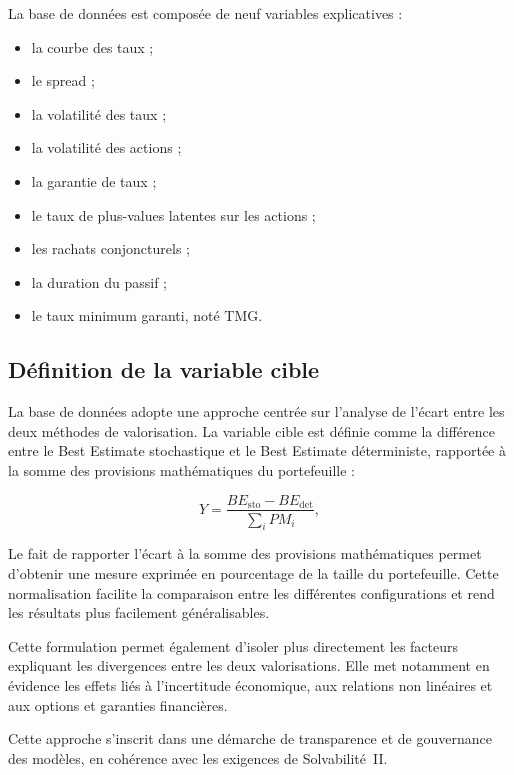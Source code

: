 La base de données est composée de neuf variables explicatives :

\begin{itemize}[label=\textemdash, nosep, leftmargin=2.5em]
    \item la courbe des taux ;
    \item le spread ;
    \item la volatilité des taux ;
    \item la volatilité des actions ;
    \item la garantie de taux ;
    \item le taux de plus-values latentes sur les actions ;
    \item les rachats conjoncturels ;
    \item la duration du passif ;
    \item le taux minimum garanti, noté TMG.
\end{itemize}


\subsection{Définition de la variable cible}

La base de données adopte une approche centrée sur l'analyse de l'écart entre les deux méthodes de valorisation. La variable cible est définie comme la différence entre le Best Estimate stochastique et le Best Estimate déterministe, rapportée à la somme des provisions mathématiques du portefeuille :

\begin{equation}
    Y =
    \frac{BE_{\mathrm{sto}}-BE_{\mathrm{det}}}
    {\displaystyle\sum_{i} PM_i},
    \label{eq:variable_cible}
\end{equation}


Le fait de rapporter l'écart à la somme des provisions mathématiques permet d'obtenir une mesure exprimée en pourcentage de la taille du portefeuille. Cette normalisation facilite la comparaison entre les différentes configurations et rend les résultats plus facilement généralisables.

Cette formulation permet également d'isoler plus directement les facteurs expliquant les divergences entre les deux valorisations. Elle met notamment en évidence les effets liés à l'incertitude économique, aux relations non linéaires et aux options et garanties financières.

Cette approche s'inscrit dans une démarche de transparence et de gouvernance des modèles, en cohérence avec les exigences de Solvabilité~II.


